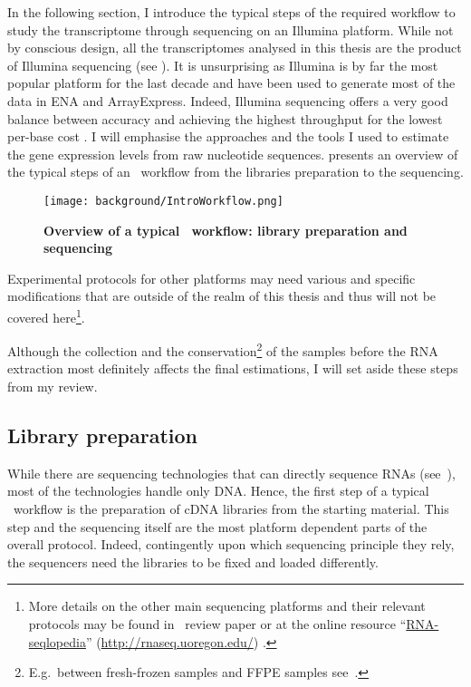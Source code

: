 In the following section,
I introduce the typical steps of the required workflow
to study the transcriptome through sequencing on an Illumina platform.
While not by conscious design, all the transcriptomes analysed in this thesis are
the product of Illumina sequencing (see
).
It is unsurprising as Illumina is by far
the most popular platform for the last decade  and
have been used to generate most of the data in \gls{ENA} and \gls{ArrayExpress}.
Indeed, Illumina sequencing offers a very
good balance between accuracy and achieving the highest
throughput for the lowest per-base cost .
I will emphasise the approaches and
the tools I used to estimate the gene expression levels from raw nucleotide
sequences.
 presents an overview of the typical steps of an
\Rnaseq\ workflow from the libraries preparation to the sequencing.

\begin{figure}
    \texttt{[image: background/IntroWorkflow.png]}\centering
    \caption[Overview of a \Rnaseq\ workflow: library preparation
    and sequencing]{\label{fig:OverviewRnaseqPrepSeq}\textbf{Overview of
    a typical \Rnaseq\ workflow:
    library preparation and sequencing}}
\end{figure}

Experimental protocols for other platforms may need various and specific
modifications that are outside of the realm of this thesis and thus will not be
covered here\footnote{More details on the other main sequencing platforms and their
relevant protocols may be found in~\citet{rnaseqProtocols} review paper or at the
online resource \enquote{\href{http://rnaseq.uoregon.edu/}{RNA-seqlopedia}}
(\href{http://rnaseq.uoregon.edu/}{http://rnaseq.uoregon.edu/})
.}.

Although the collection and the conservation\footnote{E.g.\ between fresh-frozen
samples and \gls{FFPE} samples see~\citet{sampleConservationMatters}.}
of the samples before the
\gls{RNA} extraction most definitely affects the final estimations,
I will set aside these steps from my review.

\subsection{Library preparation}\label{subsec:libPrep}

While there are sequencing technologies that can directly sequence \glspl{RNA}
(see~\cite{rnaDirectSeq}), most of the technologies handle only \gls{DNA}.
Hence, the first step of a typical \Rnaseq\ workflow is the preparation of
\gls{cDNA} libraries from the starting material. This step and the sequencing
itself are the most platform dependent parts of the overall protocol.
Indeed, contingently upon which sequencing principle they rely,
the sequencers need the libraries to be fixed and loaded differently.

